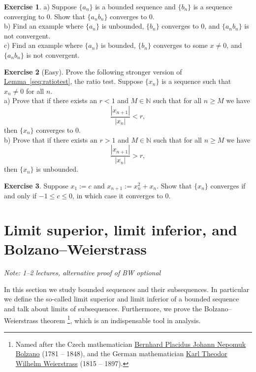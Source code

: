 \documentclass[12pt]{book}
\newcommand{\abs}[1]{\left\lvert {#1} \right\rvert}
\newcommand{\N}{{\mathbb{N}}}
\newcommand{\sectionnotes}[1]{\noindent \emph{Note: #1} \medskip \par}
\newcommand{\sectionnewpage}{\clearpage}
\theoremstyle{plain}
\theoremstyle{remark}
\theoremstyle{definition}
\theoremstyle{exercise}
\newtheorem{exercise}{Exercise}[section]
\theoremstyle{example}
\newcommand{\lemmaref}[1]{\hyperref[#1]{Lemma~\ref*{#1}}}
\begin{document}
\begin{exercise}
a) Suppose $\{ a_n \}$ is a bounded sequence and $\{ b_n \}$ is a sequence
converging to 0. Show that $\{ a_n b_n \}$ converges to 0.\\
b) Find an example where $\{ a_n \}$ is unbounded, $\{ b_n \}$ converges to
0, and $\{ a_n b_n \}$ is not convergent.\\
c) Find an example where $\{ a_n \}$ is bounded, $\{ b_n \}$ converges to
some $x \not= 0$, and $\{ a_n b_n \}$ is not convergent.
\end{exercise}

\begin{exercise}[Easy] \label{exercise:strongerratiotest1}
Prove the following stronger version of \lemmaref{seq:ratiotest}, the ratio
test.  
Suppose $\{ x_n \}$ is a sequence such that $x_n \not= 0$ for all
$n$.
\\
a) Prove that if there exists an $r < 1$ and $M \in \N$ such that
for all $n \geq M$ we have
\begin{equation*}
\frac{\abs{x_{n+1}}}{\abs{x_n}} < r ,
\end{equation*}
then $\{ x_n \}$ converges to $0$.
\\
b) Prove that if there exists an $r > 1$ and $M \in \N$ such that
for all $n \geq M$ we have
\begin{equation*}
\frac{\abs{x_{n+1}}}{\abs{x_n}} > r ,
\end{equation*}
then $\{ x_n \}$ is unbounded.
\end{exercise}

\begin{exercise} \label{exercise:convergentinitialvalues}
Suppose $x_1 := c$ and $x_{n+1} := x_n^2+x_n$.
Show that $\{ x_n \}$ converges if and only if $-1 \leq c \leq 0$, in which
case it converges to 0.
\end{exercise}


\sectionnewpage
\section{Limit superior, limit inferior, and Bolzano--Weierstrass}
\label{sec:bw}

\sectionnotes{1--2 lectures, alternative proof of BW optional}

In this section we study bounded sequences and their subsequences.
In particular we define the so-called limit superior and limit inferior
of a bounded sequence and talk about limits of subsequences.
Furthermore, we prove the
Bolzano--Weierstrass theorem%
\footnote{%
Named after the Czech mathematician
\href{http://en.wikipedia.org/wiki/Bernard_Bolzano}{Bernhard Placidus Johann Nepomuk Bolzano}
(1781 -- 1848), and the German mathematician
\href{http://en.wikipedia.org/wiki/Karl_Weierstrass}{Karl Theodor Wilhelm Weierstrass}
(1815 -- 1897).}, which is an
indispensable tool in analysis.
\end{document}
